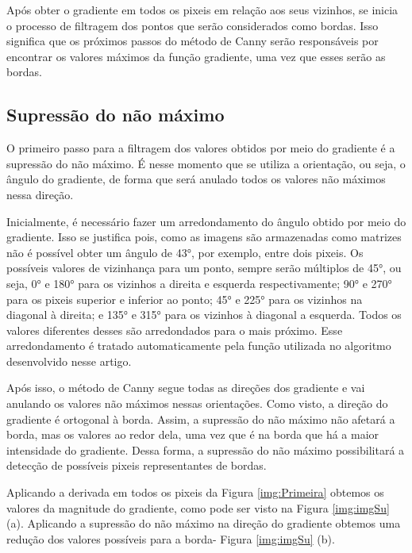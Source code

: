 \documentclass[a4paper,alpha-refs]{RBCA_v1.0}
\begin{document}
Após obter o gradiente em todos os pixeis em relação aos seus vizinhos, se inicia o processo de filtragem dos pontos que serão considerados como bordas. Isso significa que os próximos passos do método de Canny serão responsáveis por encontrar os valores máximos da função gradiente, uma vez que esses serão as bordas.

\subsection{Supressão do não máximo}

O primeiro passo para a filtragem dos valores obtidos por meio do gradiente é a supressão do não máximo. É nesse momento que se utiliza a orientação, ou seja, o ângulo do gradiente, de forma que será anulado todos os valores não máximos nessa direção.

Inicialmente, é necessário fazer um arredondamento do ângulo obtido por meio do gradiente. Isso se justifica pois, como as imagens são armazenadas como matrizes não é possível obter um ângulo de 43°, por exemplo, entre dois pixeis. Os possíveis valores de vizinhança para um ponto, sempre serão múltiplos de 45°, ou seja, 0° e 180° para os vizinhos a direita e esquerda respectivamente; 90° e 270° para os pixeis superior e inferior ao ponto; 45° e 225° para os vizinhos na diagonal à direita; e 135° e 315° para os vizinhos à diagonal a esquerda. Todos os valores diferentes desses são arredondados para o mais próximo. Esse arredondamento é tratado automaticamente pela função utilizada no algoritmo desenvolvido nesse artigo.

Após isso, o método de Canny segue todas as direções dos gradiente e vai anulando os valores não máximos nessas orientações. Como visto, a direção do gradiente é ortogonal à borda. Assim, a supressão do não máximo não afetará a borda, mas os valores ao redor dela, uma vez que é na borda que há a maior intensidade do gradiente. Dessa forma, a supressão do não máximo possibilitará a detecção de possíveis pixeis representantes de bordas. 

Aplicando a derivada em todos os pixeis da Figura \ref{img:Primeira} obtemos os valores da magnitude do gradiente, como pode ser visto na Figura \ref{img:imgSu} (a). Aplicando a supressão do não máximo na direção do gradiente obtemos uma redução dos valores possíveis para a borda- Figura \ref{img:imgSu} (b).   
\end{document}
